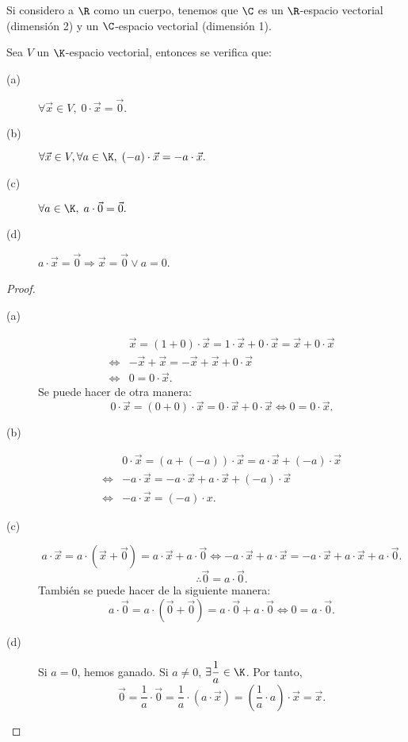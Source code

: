 Si considero a $\displaystyle \R $ como un cuerpo, tenemos que $\displaystyle \C $ es un $\displaystyle \R $-espacio vectorial (dimensión 2) y un $\displaystyle \C$-espacio vectorial (dimensión 1). 

\begin{ftheorem}[]
\normalfont Sea $\displaystyle V $  un $\displaystyle \K $-espacio vectorial, entonces se verifica que:
\begin{description}
\item[(a)] $\displaystyle \forall \vec{x} \in V, \; 0 \cdot \vec{x} = \vec{0}. $ 
\item[(b)] $\displaystyle \forall \vec{x} \in V, \forall a \in \K, \; \left(-a\right) \cdot \vec{x} = - a \cdot \vec{x}. $ 
\item[(c)] $\displaystyle \forall a \in \K, \; a \cdot \vec{0} = \vec{0}. $ 
\item[(d)] $\displaystyle a \cdot \vec{x} = \vec{0} \Rightarrow \vec{x}=\vec{0} \lor a = 0 $.
\end{description}
\end{ftheorem}

\begin{proof}
\begin{description}
\item[(a)]
	\[
	\begin{split}
	& \vec{x} = \left(1 + 0\right) \cdot \vec{x} = 1 \cdot \vec{x} + 0 \cdot \vec{x} = \vec{x} + 0 \cdot \vec{x} \\
	\iff & - \vec{x} + \vec{x} = - \vec{x} + \vec{x} + 0 \cdot \vec{x} \\
	\iff & 0 = 0 \cdot \vec{x}.
	\end{split}
	\]
Se puede hacer de otra manera:
\[0 \cdot \vec{x} = \left(0 + 0\right) \cdot \vec{x} = 0 \cdot \vec{x} + 0 \cdot \vec{x} \iff 0 = 0 \cdot \vec{x} .\]
\item[(b)] 
	\[
	\begin{split}
	& 0 \cdot \vec{x} = \left(a + \left( - a\right)\right) \cdot \vec{x} = a \cdot \vec{x} + \left(-a\right) \cdot \vec{x} \\
	\iff & - a \cdot \vec{x} = - a \cdot \vec{x} + a \cdot \vec{ x} + \left(- a \right) \cdot \vec{x} \\
	\iff & - a \cdot \vec{x} = \left(- a \right) \cdot x.
	\end{split}
	\]
\item[(c)] 
	\[ a \cdot \vec{x} = a \cdot \left(\vec{x} + \vec{0}\right) = a \cdot \vec{x} + a \cdot \vec{0} \iff - a \cdot \vec{x} + a \cdot \vec{x} = - a \cdot \vec{x} + a \cdot \vec{x} + a \cdot \vec{0} .\]
	\[\therefore \vec{0} = a \cdot \vec{0} .\]
También se puede hacer de la siguiente manera:
\[a \cdot \vec{0} = a \cdot \left(\vec{0} + \vec{0}\right) = a \cdot \vec{0} + a \cdot \vec{0} \iff0 = a \cdot \vec{0} .\]
\item[(d)] Si $\displaystyle a = 0 $, hemos ganado. Si $\displaystyle a \neq 0 $, $\displaystyle \exists \frac{1}{a} \in \K $. Por tanto, 
	\[\vec{0} = \frac{1}{a} \cdot \vec{0} = \frac{1}{a} \cdot \left(a \cdot \vec{x}\right) = \left(\frac{1}{a} \cdot a\right) \cdot \vec{x} = \vec{x} .\]
\end{description}
\end{proof}


